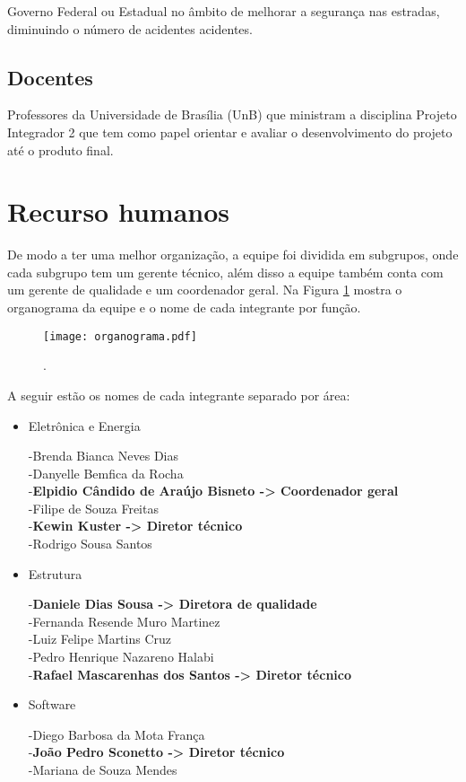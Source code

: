 Governo Federal ou Estadual no âmbito de melhorar a segurança nas estradas, diminuindo o número de acidentes acidentes. 

\subsection {Docentes}

Professores da Universidade de Brasília (UnB) que ministram a disciplina Projeto Integrador 2 que tem como papel orientar e avaliar o desenvolvimento do projeto até o produto final.

\section{Recurso humanos}

 De modo a ter uma melhor organização, a equipe foi dividida em subgrupos, onde cada subgrupo tem um gerente técnico, além disso a equipe também conta com um gerente de qualidade e um coordenador geral. Na Figura \ref{fig:organograma} mostra o organograma da equipe e o nome de cada integrante por função.
 
\begin{figure}[h]
\centering
\texttt{[image: organograma.pdf]}
\caption{.}\label{fig:organograma}
\end{figure} 

A seguir estão os nomes de cada integrante separado por área:

\begin{itemize}
\item Eletrônica e Energia

-Brenda Bianca Neves Dias\\
-Danyelle Bemfica da Rocha\\
-\textbf{Elpidio Cândido de Araújo Bisneto -> Coordenador geral}\\
-Filipe de Souza Freitas\\
-\textbf{Kewin Kuster -> Diretor técnico}\\
-Rodrigo Sousa Santos

\item Estrutura

-\textbf{Daniele Dias Sousa -> Diretora de qualidade}\\
-Fernanda Resende Muro Martinez\\
-Luiz Felipe Martins Cruz\\
-Pedro Henrique Nazareno Halabi\\
-\textbf{Rafael Mascarenhas dos Santos -> Diretor técnico}

\item Software

-Diego Barbosa da Mota França\\
-\textbf{João Pedro Sconetto -> Diretor técnico}\\
-Mariana de Souza Mendes 


\end{itemize}

